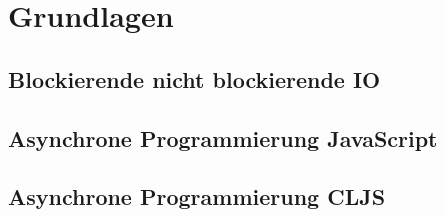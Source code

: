\chapter{Grundlagen}

\section{Blockierende nicht blockierende \acs{IO}}



\section{Asynchrone Programmierung JavaScript}

\section{Asynchrone Programmierung \acl{CLJS}}






